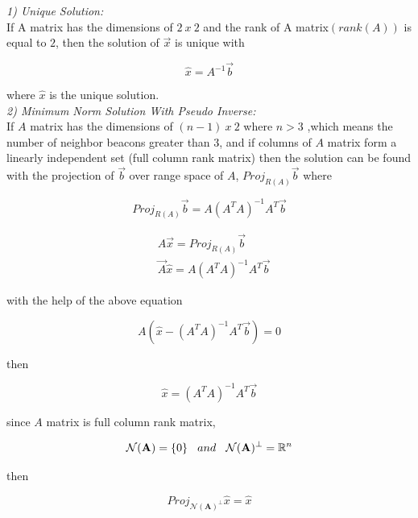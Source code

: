 \textit{1) Unique Solution:}\\
 If A matrix has the dimensions of $2\ x\ 2$ and the rank of A matrix$(rank(A))$ is equal to $2$, then the solution of $\vec{x}$ is unique with

\begin{equation}
\hat{x} = A^{-1}\vec{b}
\end{equation}

where $\hat{x}$ is the unique solution. \\
  
\textit{ 2) Minimum Norm Solution With Pseudo Inverse:} \\  
If $A$ matrix has the dimensions of $(n-1)\ x\ 2$ where $n>3$ ,which means the number of neighbor beacons greater than $3$, and if columns of $A$ matrix form a linearly independent set (full column rank matrix) then the solution can be found with the projection of $\vec{b}$ over range space of $A$, $Proj_{R(A)}\vec{b}$ where

\begin{equation}
Proj_{R(A)}\vec{b} = A (A^TA)^{-1}A^T\vec{b}
\end{equation}

\begin{align*}
& A\vec{x} = Proj_{R(A)}\vec{b}\\
& \vec{A}\hat{x} = A(A^TA)^{-1}A^T\vec{b}
\end{align*}
 
with the help of the above equation

\begin{equation}
 A(\hat{x} - (A^TA)^{-1}A^T\vec{b}) = 0
\end{equation}

then 

\begin{equation}
\hat{x} = (A^TA)^{-1}A^T\vec{b}
\end{equation}
  
since $A$ matrix is full column rank matrix,
  
\begin{align*}
\mathcal{N}(\mathbf{A}) = \{0\} \hspace{0.3cm}  and  \hspace{0.3cm}  \mathcal{N}(\mathbf{A})^\perp =\mathbb{R} ^n 
\end{align*}
  
then 
  
\begin{equation}
Proj_{ \mathcal{N}(\mathbf{A})^\perp}\hat{x} = \hat{x}
\end{equation}
  
